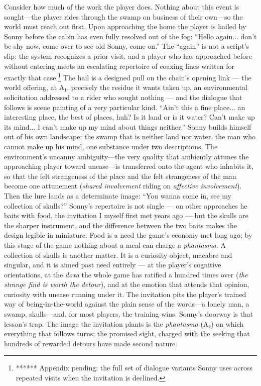 Consider how much of the work the player does. Nothing about this event is sought---the player rides through the swamp on business of their own---so the world must reach out first. Upon approaching the home the player is hailed by Sonny before the cabin has even fully resolved out of the fog: ``Hello again... don't be shy now, come over to see old Sonny, come on.'' The ``again'' is not a script's slip: the system recognizes a prior visit, and a player who has approached before without entering meets an escalating repertoire of coaxing lines written for exactly that case.\footnote{****** Appendix pending: the full set of dialogue variants Sonny uses across repeated visits when the invitation is declined.} The hail is a designed pull on the chain's opening link --- the world offering, at A₁, precisely the residue it wants taken up, an environmental solicitation addressed to a rider who sought nothing --- and the dialogue that follows is scene painting of a very particular kind. ``Ain't this a fine place... an interesting place, the best of places, huh? Is it land or is it water? Can't make up its mind... I can't make up my mind about things neither.''
Sonny builds himself out of his own landscape: the swamp that is neither land nor water, the man who cannot make up his mind, one substance under two descriptions. The environment's uncanny ambiguity---the very quality that ambiently attunes the approaching player toward unease---is transferred onto the agent who inhabits it, so that the felt strangeness of the place and the felt strangeness of the man become one attunement (\textit{shared involvement} riding on \textit{affective involvement}). Then the lure lands as a determinate image: ``You wanna come in, see my collection of skulls?'' Sonny's repertoire is not single --- on other approaches he baits with food, the invitation I myself first met years ago --- but the skulls are the sharper instrument, and the difference between the two baits makes the design legible in miniature. Food is a need the game's economy met long ago; by this stage of the game nothing about a meal can charge a \textit{phantasma}. A collection of skulls is another matter. It is a curiosity object, macabre and singular, and it is aimed past need entirely --- at the player's cognitive orientations, at the \textit{doxa} the whole game has ratified a hundred times over (\textit{the strange find is worth the detour}), and at the emotion that attends that opinion, curiosity with unease running under it. The invitation pits the player's trained way of being-in-the-world against the plain sense of the words---a lonely man, a swamp, skulls---and, for most players, the training wins. Sonny's doorway is that lesson's trap. The image the invitation plants is the \textit{phantasma} (A₂) on which everything that follows turns: the promised sight, charged with the seeking that hundreds of rewarded detours have made second nature.
